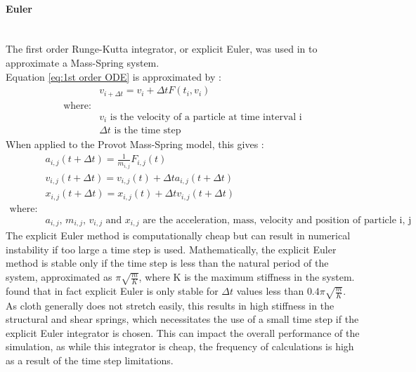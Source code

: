 \paragraph{Euler}\leavevmode\\
The first order Runge-Kutta integrator, or explicit Euler, was used in \textcite{Provot2001} to approximate a Mass-Spring system.
\\Equation \ref{eq:1st order ODE} is approximated by \parencite[3]{Wang2009a}:
\begin{equation}
\begin{split}
\label{eq:explicit euler formal}
  &v_{i + \Delta t} = v_{i} + \Delta t F(t_{i}, v_{i})
  \\\text{where:}
  \\&\text{$v_{i}$ is the velocity of a particle at time interval i}
  \\&\text{$\Delta t$ is the time step}
\end{split}
\end{equation}
When applied to the Provot Mass-Spring model, this gives \parencite[3]{Provot2001}:
\begin{equation}
\begin{split}
\label{eq:explicit euler provot}
  &a_{i, j}(t + \Delta t) = \frac{1}{m_{i, j}}F_{i, j}(t)
  \\&v_{i, j}(t + \Delta t) = v_{i, j}(t) + \Delta ta_{i, j}(t + \Delta t)
  \\&x_{i, j}(t + \Delta t) = x_{i, j}(t) + \Delta tv_{i, j}(t + \Delta t)
  \\\text{where:}
  \\&\text{$a_{i, j}$, $m_{i, j}$, $v_{i, j}$ and $x_{i, j}$ are the acceleration, mass, velocity and position of particle i, j respectively}
\end{split}
\end{equation}
The explicit Euler method is computationally cheap but can result in numerical instability if too large a time step is used. Mathematically, the explicit Euler method is stable only if the time step is less than the natural period of the system, approximated as $\pi\sqrt{\frac{m}{K}}$, where K is the maximum stiffness in the system. \textcite[2]{Vassilev2001} found that in fact explicit Euler is only stable for $\Delta t$ values less than $0.4\pi\sqrt{\frac{m}{K}}$. 
\\As cloth generally does not stretch easily, this results in high stiffness in the structural and shear springs, which necessitates the use of a small time step if the explicit Euler integrator is chosen. This can impact the overall performance of the simulation, as while this integrator is cheap, the frequency of calculations is high as a result of the time step limitations.

